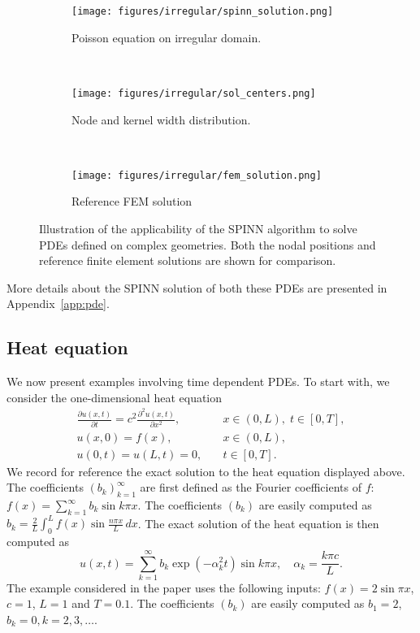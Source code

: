 \documentclass[12pt]{article}
\begin{document}
\begin{figure}
\begin{subfigure}{0.32\textwidth}
\centering
\texttt{[image: figures/irregular/spinn\_solution.png]}
\caption{Poisson equation on irregular domain.}
\label{fig:poisson2d_irregular}
\end{subfigure}
~
\begin{subfigure}{0.32\textwidth}
\texttt{[image: figures/irregular/sol\_centers.png]}
\caption{Node and kernel width distribution.}
\label{fig:poisson2d_irregular_nodes}
\end{subfigure}
~
\begin{subfigure}{0.32\textwidth}
\texttt{[image: figures/irregular/fem\_solution.png]}
\caption{Reference FEM solution}
\label{fig:poisson2d_irregular_fem}
\end{subfigure}
\caption{Illustration of the applicability of the SPINN algorithm to solve PDEs defined on complex geometries. Both the nodal positions and reference finite element solutions are shown for comparison.}
\label{fig:spinn_pde2d_irred_dom}
\end{figure}

More details about the SPINN solution of both these PDEs are presented in Appendix~\ref{app:pde}.

\subsection{Heat equation}
We now present examples involving time dependent PDEs. To start with, we consider the one-dimensional heat equation
\begin{displaymath}
\begin{split}
\frac{\partial u(x,t)}{\partial t} = c^2\frac{\partial^2 u(x,t)}{\partial x^2},& \quad x \in (0,L), \; t \in [0, T],\\
u(x, 0) = f(x),& \quad x \in (0,L),\\
u(0,t) = u(L,t) = 0,& \quad t \in [0,T].
\end{split}
\end{displaymath}
We record for reference the exact solution to the heat equation displayed above. The coefficients $(b_k)_{k=1}^{\infty}$ are first defined as the Fourier coefficients of $f$: $f(x) = \sum_{k=1}^{\infty} b_k \sin k\pi x$. The coefficients $(b_k)$ are easily computed as $b_k = \frac{2}{L}\int_{0}^{L} f(x) \sin \frac{n\pi x}{L}\, dx$. The exact solution of the heat equation is then computed as
\begin{displaymath}
u(x,t) = \sum_{k=1}^{\infty} b_k \exp (-\alpha_k^2 t) \sin k\pi x, \quad \alpha_k = \frac{k\pi c}{L}.
\end{displaymath}
The example considered in the paper uses the following inputs: $f(x) = 2\sin \pi x$, $c = 1$, $L = 1$ and $T = 0.1$. The coefficients $(b_k)$ are easily computed as $b_1 = 2$, $b_k = 0, k = 2, 3, \ldots$.
\end{document}
